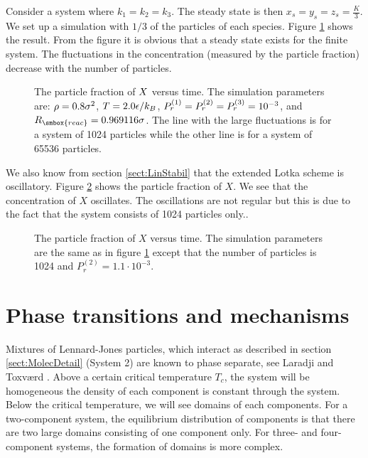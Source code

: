 Consider a system where $k_1=k_2=k_3$. The steady state is then
$x_s=y_s=z_s = \frac{K}{3}$. We set up a simulation with $1/3$ of
the particles of each species. Figure \ref{fig:steady} shows the
result. From the figure it is obvious that a steady state exists for
the finite system. The fluctuations in the concentration (measured by
the particle fraction) decrease with the number of particles.

\begin{figure}
  \begin{center}
    
  \end{center}
  \caption[The steady state]{The particle fraction of \protect$X\protect$ versus
    time. The simulation parameters are: \protect$\rho=0.8\sigma^2\protect$,
    \protect$T=2.0\epsilon/k_B\protect\protect$,
    \protect$P_r^{(1)}=P_r^{(2)}=P_r^{(3)} = 10^{-3}\protect$, and
    \protect$R_{\smbox{reac}}=0.969116\sigma\protect$. The line with
    the large fluctuations is for a system of 1024 particles while the
    other line is for a system of 65536 particles.\label{fig:steady}}
\end{figure}

We also know from section \ref{sect:LinStabil} that the extended Lotka
scheme is oscillatory. Figure \ref{fig:osc} shows the particle fraction of
$X$. We see that the concentration of $X$ oscillates. The oscillations are
not regular but this is due to the fact that the system consists of 1024
particles only..

\begin{figure}
  \begin{center}
    
  \end{center}
  \caption[The oscillatory state]{The particle fraction of $X$ versus time.
   The simulation parameters are the same as in figure \ref{fig:steady} except
   that the number of particles is 1024 and $P_r^{(2)} = 1.1\cdot 10^{-3}$.
   \label{fig:osc}}
\end{figure}


\section{Phase transitions and mechanisms}
Mixtures of Lennard-Jones particles, which interact as described in
section \ref{sect:MolecDetail} (System 2) are known to phase separate,
see \eg Laradji \etal \cite{Laradji96} and Toxv{\ae}rd \etal
\cite{Toxvaerd95a}. Above a 
certain critical temperature $T_c$, the system will be homogeneous
\ie the density of each component is constant through the
system. Below the critical temperature, we will see domains of each
components. For a two-component system, the equilibrium distribution
of components is that there are two large domains consisting of
one component only. For three- and four-component systems, the
formation of domains is more complex. 

